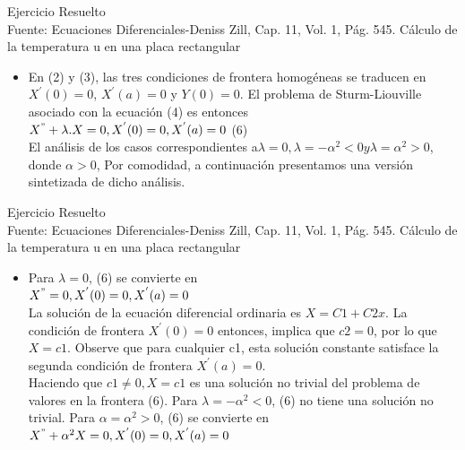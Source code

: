 \documentclass[10pt,a4paper]{beamer}
\begin{document}
\begin{frame}{Ejercicio Resuelto\\
}{Fuente: Ecuaciones Diferenciales-Deniss Zill, Cap. 11, Vol. 1, Pág. 545.
Cálculo de la temperatura u en una placa rectangular}


  \begin{itemize}
  \item
    En (2) y (3), las tres condiciones de frontera homogéneas se traducen en $X^{'}(0)=0$, $X^{'}(a)=0$ y $Y(0)=0$. El problema de Sturm-Liouville asociado con la ecuación (4) es entonces\\
$X^{"}+\lambda.X=0, X^{'}(0)=0, X^{'}(a)=0$ (6)\\
El análisis de los casos correspondientes a$\lambda=0, \lambda=-\alpha^{2}<0 y \lambda=\alpha^{2}>0$, donde $\alpha>0$, Por comodidad, a continuación
presentamos una versión sintetizada de dicho análisis.
    
  \end{itemize}
\end{frame}

\begin{frame}{Ejercicio Resuelto\\
}{Fuente: Ecuaciones Diferenciales-Deniss Zill, Cap. 11, Vol. 1, Pág. 545.
Cálculo de la temperatura u en una placa rectangular}


  \begin{itemize}
  \item
    Para $\lambda=0$, (6) se convierte en\\
$X^{"}=0,X^{'}(0)=0,X^{'}(a)=0$\\
La solución de la ecuación diferencial ordinaria es $X=C1+C2x$. La condición de frontera
$X^{'}(0)=0$ entonces, implica que $c2=0$, por lo que $X=c1$. Observe que para cualquier
c1, esta solución constante satisface la segunda condición de frontera $X^{'}(a)=0$.\\
Haciendo que $c1\neq 0, X=c1 $ es una solución no trivial del problema de valores en la
frontera (6). Para $\lambda=-\alpha^{2}<0$, (6) no tiene una solución no trivial. Para $\alpha=\alpha^{2}>0$, (6)
se convierte en\\
$X^{"}+\alpha^{2}X=0,X^{'}(0)=0,X^{'}(a)=0$\\
    
  \end{itemize}
\end{frame}
\end{document}
